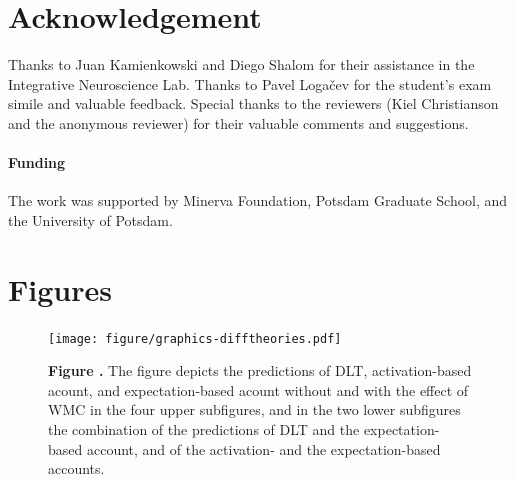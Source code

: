 \documentclass{frontiersSCNS}\usepackage{knitr}
\begin{document}
\section*{Acknowledgement}
Thanks to Juan Kamienkowski and Diego Shalom for their assistance in the Integrative Neuroscience Lab. Thanks to Pavel Loga\v{c}ev for the student's exam simile and valuable feedback.  Special thanks to the reviewers (Kiel Christianson and the anonymous reviewer) for their valuable comments and suggestions. 

\paragraph{Funding\textcolon} 
The work was supported by Minerva Foundation, Potsdam Graduate School, and the University of Potsdam.


 








\section*{Figures}


\begin{figure}
\begin{center}
\texttt{[image: figure/graphics-difftheories.pdf]} 
\end{center}
\textbf{\label{fig:difftheories} Figure .}{ The figure depicts the predictions of DLT, activation-based acount, and expectation-based acount without and with the effect of WMC in the four upper subfigures, and in the two lower subfigures the combination of the predictions of DLT and the expectation-based account, and of the activation- and the expectation-based accounts.}
\end{figure}
\end{document}
